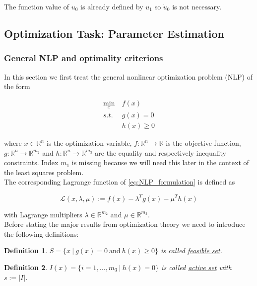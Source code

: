 \documentclass{scrartcl}[12pt, halfparskip]
\newtheorem{Definition}{Definition}
\begin{document}
The function value of $u_0$ is already defined by $u_1$ so $\dot{u}_0$ is not necessary.




\subsection{Optimization Task: Parameter Estimation}


\subsubsection{General NLP and optimality criterions}
In this section we first treat the general nonlinear optimization problem (NLP) of the form

\begin{align}
	\min_x & \ f(x) \label{eq:NLP_formulation} \\
	s.t. & \ g(x) = 0 \nonumber \\
	& \ h(x) \ge 0 \nonumber
\end{align}

where $x \in \mathbb{R}^n$ is the optimization variable, $f: \mathbb{R}^n \rightarrow \mathbb{R}$ is the objective function, $g: \mathbb{R}^n \rightarrow \mathbb{R}^{m_2}$ and $h: \mathbb{R}^n \rightarrow \mathbb{R}^{m_3}$ are the equality and respectively inequality constraints. Index $m_1$ is missing because we will need this later in the context of the least squares problem. \\
The corresponding Lagrange function of \eqref{eq:NLP_formulation} is defined as

\begin{equation}
	\mathcal{L}(x,\lambda,\mu) := f(x) - \lambda^T g(x) - \mu^T h(x)
\end{equation}

with Lagrange multipliers $\lambda \in \mathbb{R}^{m_2}$ and $\mu \in \mathbb{R}^{m_3}$. \\

Before stating the major results from optimization theory we need to introduce the following definitions:

\begin{Definition}
	$S = \{ x \ | \ g(x) = 0 \ \text{and} \ h(x) \ge 0 \}$ is called \underline{feasible set}.
\end{Definition}

\begin{Definition}
	$I(x) = \{ i=1,...,m_3 \ | \ h(x) = 0 \}$ is called \underline{active set} with $s := \vert I \vert$.
\end{Definition}
\end{document}
